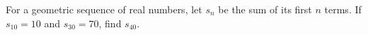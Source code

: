 For a geometric sequence of real numbers, let $s_n$ be the sum of its first $n$ terms. If $s_{10}=10$ and $s_{30}=70$, find $s_{40}$.
